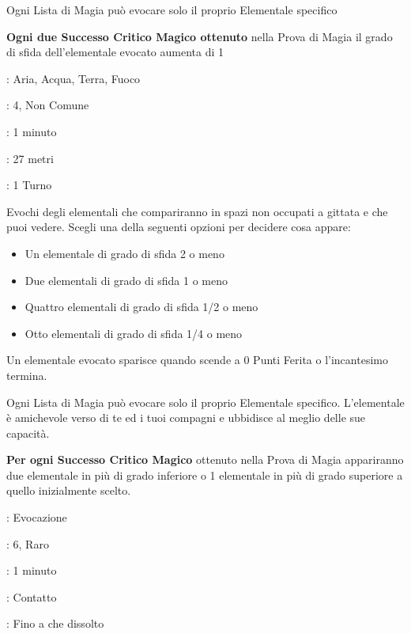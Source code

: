 \begin{multicols}{2}
Ogni Lista di Magia può evocare solo il proprio Elementale specifico

\textbf{Ogni due Successo Critico Magico ottenuto} nella Prova di Magia il grado di sfida dell'elementale evocato aumenta di 1

\noindent\colorbox{OBSSgold!10}{
\begin{minipage}{0.95\linewidth}
\begin{description}[noitemsep, topsep=0pt, parsep=0pt, partopsep=0pt, leftmargin=0cm, labelwidth=1.3cm]
	\item[\textbf{Lista}]: Aria, Acqua, Terra, Fuoco
	\item[\textbf{Livello}]: 4, Non Comune
	\item[\textbf{Lancio}]: 1 minuto
	\item[\textbf{Gittata}]: 27 metri
	\item[\textbf{Durata}]: 1 Turno
\end{description}
\end{minipage}}\smallskip

Evochi degli elementali che compariranno in spazi non occupati a gittata e che puoi vedere. Scegli una della seguenti opzioni per decidere cosa appare:

\begin{itemize}[leftmargin=*] \setlength{\itemsep}{-1pt}
	\item Un elementale di grado di sfida 2 o meno
	\item Due elementali di grado di sfida 1 o meno
	\item Quattro elementali di grado di sfida 1/2 o meno
	\item Otto elementali di grado di sfida 1/4 o meno
\end{itemize}

Un elementale evocato sparisce quando scende a 0 Punti Ferita o l'incantesimo termina.

Ogni Lista di Magia può evocare solo il proprio Elementale specifico. L'elementale è amichevole verso di te ed i tuoi compagni e ubbidisce al meglio delle sue capacità.

\textbf{Per ogni Successo Critico Magico} ottenuto nella Prova di Magia appariranno due elementale in più di grado inferiore o 1 elementale in più di grado superiore a quello inizialmente scelto.

\noindent\colorbox{OBSSgold!10}{
\begin{minipage}{0.95\linewidth}
\begin{description}[noitemsep, topsep=0pt, parsep=0pt, partopsep=0pt, leftmargin=0cm, labelwidth=1.3cm]
	\item[\textbf{Lista}]: Evocazione
	\item[\textbf{Livello}]: 6, Raro
	\item[\textbf{Lancio}]: 1 minuto
	\item[\textbf{Gittata}]: Contatto
	\item[\textbf{Durata}]: Fino a che dissolto
\end{description}
\end{minipage}}\smallskip


\end{multicols}
